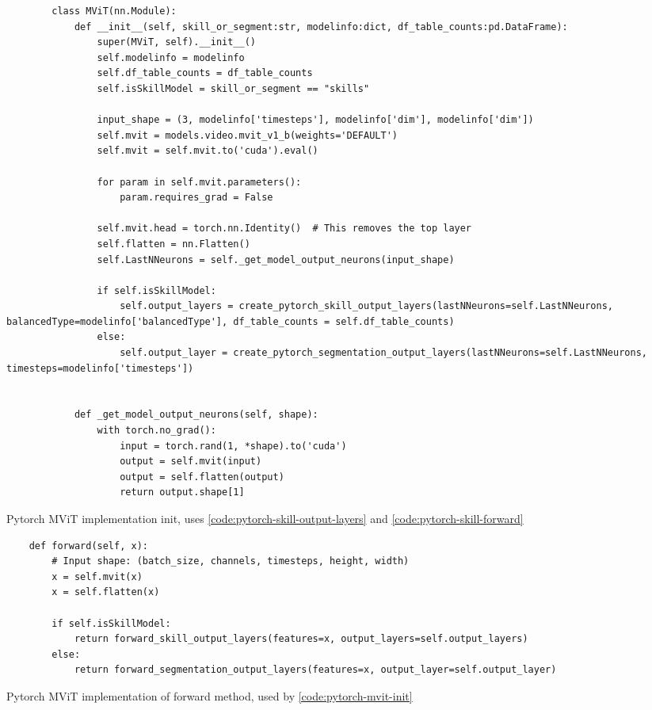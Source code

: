 \begin{listing}
    \begin{verbatim}
        class MViT(nn.Module):
            def __init__(self, skill_or_segment:str, modelinfo:dict, df_table_counts:pd.DataFrame):
                super(MViT, self).__init__()
                self.modelinfo = modelinfo
                self.df_table_counts = df_table_counts
                self.isSkillModel = skill_or_segment == "skills"
                
                input_shape = (3, modelinfo['timesteps'], modelinfo['dim'], modelinfo['dim'])
                self.mvit = models.video.mvit_v1_b(weights='DEFAULT')
                self.mvit = self.mvit.to('cuda').eval()

                for param in self.mvit.parameters():
                    param.requires_grad = False

                self.mvit.head = torch.nn.Identity()  # This removes the top layer
                self.flatten = nn.Flatten()
                self.LastNNeurons = self._get_model_output_neurons(input_shape)
                
                if self.isSkillModel:
                    self.output_layers = create_pytorch_skill_output_layers(lastNNeurons=self.LastNNeurons, balancedType=modelinfo['balancedType'], df_table_counts = self.df_table_counts)
                else:
                    self.output_layer = create_pytorch_segmentation_output_layers(lastNNeurons=self.LastNNeurons, timesteps=modelinfo['timesteps'])

                
            def _get_model_output_neurons(self, shape):
                with torch.no_grad():
                    input = torch.rand(1, *shape).to('cuda')
                    output = self.mvit(input)
                    output = self.flatten(output)
                    return output.shape[1]
    \end{verbatim}
    \caption[Pytorch MViT implementation init]{Pytorch MViT implementation init, uses \ref{code:pytorch-skill-output-layers} and \ref{code:pytorch-skill-forward}}
    \label{code:pytorch-mvit-init}
\end{listing}

\begin{listing}
    \begin{verbatim}
    def forward(self, x):
        # Input shape: (batch_size, channels, timesteps, height, width)
        x = self.mvit(x)
        x = self.flatten(x)
        
        if self.isSkillModel:
            return forward_skill_output_layers(features=x, output_layers=self.output_layers)
        else:
            return forward_segmentation_output_layers(features=x, output_layer=self.output_layer)
    \end{verbatim}
    \caption[Pytorch MViT forward]{Pytorch MViT implementation of forward method, used by \ref{code:pytorch-mvit-init}}
    \label{code:pytorch-skill-forward}
\end{listing}



